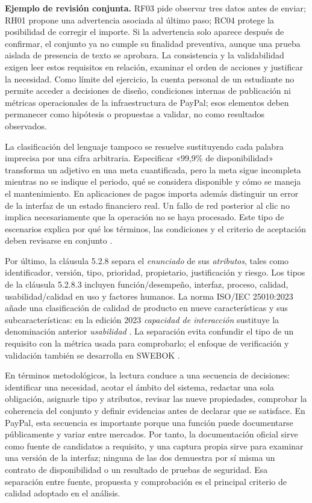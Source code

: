 \documentclass[10pt,a4paper]{extarticle}
\begin{document}
\textbf{Ejemplo de revisión conjunta.} RF03 pide observar tres datos antes de enviar; RH01 propone una advertencia asociada al último paso; RC04 protege la posibilidad de corregir el importe. Si la advertencia solo aparece después de confirmar, el conjunto ya no cumple su finalidad preventiva, aunque una prueba aislada de presencia de texto se aprobara. La consistencia y la validabilidad exigen leer estos requisitos en relación, examinar el orden de acciones y justificar la necesidad. Como límite del ejercicio, la cuenta personal de un estudiante no permite acceder a decisiones de diseño, condiciones internas de publicación ni métricas operacionales de la infraestructura de PayPal; esos elementos deben permanecer como hipótesis o propuestas a validar, no como resultados observados.

La clasificación del lenguaje tampoco se resuelve sustituyendo cada palabra imprecisa por una cifra arbitraria. Especificar «99,9\% de disponibilidad» transforma un adjetivo en una meta cuantificada, pero la meta sigue incompleta mientras no se indique el periodo, qué se considera disponible y cómo se maneja el mantenimiento. En aplicaciones de pagos importa además distinguir un error de la interfaz de un estado financiero real. Un fallo de red posterior al clic no implica necesariamente que la operación no se haya procesado. Este tipo de escenarios explica por qué los términos, las condiciones y el criterio de aceptación deben revisarse en conjunto \cite[cláusulas 5.2.6 y 5.2.7]{iso29148}.

Por último, la cláusula 5.2.8 separa el \emph{enunciado} de sus \emph{atributos}, tales como identificador, versión, tipo, prioridad, propietario, justificación y riesgo. Los tipos de la cláusula 5.2.8.3 incluyen función/desempeño, interfaz, proceso, calidad, usabilidad/calidad en uso y factores humanos. La norma ISO/IEC 25010:2023 añade una clasificación de calidad de producto en nueve características y sus subcaracterísticas: en la edición 2023 \emph{capacidad de interacción} sustituye la denominación anterior \emph{usabilidad} \cite[cláusulas 5.2.8.2 y 5.2.8.3]{iso29148}\cite{iso25010}. La separación evita confundir el tipo de un requisito con la métrica usada para comprobarlo; el enfoque de verificación y validación también se desarrolla en SWEBOK \cite{swebok2024}.

En términos metodológicos, la lectura conduce a una secuencia de decisiones: identificar una necesidad, acotar el ámbito del sistema, redactar una sola obligación, asignarle tipo y atributos, revisar las nueve propiedades, comprobar la coherencia del conjunto y definir evidencias antes de declarar que se satisface. En PayPal, esta secuencia es importante porque una función puede documentarse públicamente y variar entre mercados. Por tanto, la documentación oficial sirve como fuente de candidatos a requisito, y una captura propia sirve para examinar una versión de la interfaz; ninguna de las dos demuestra por sí misma un contrato de disponibilidad o un resultado de pruebas de seguridad. Esa separación entre fuente, propuesta y comprobación es el principal criterio de calidad adoptado en el análisis.
\end{document}
